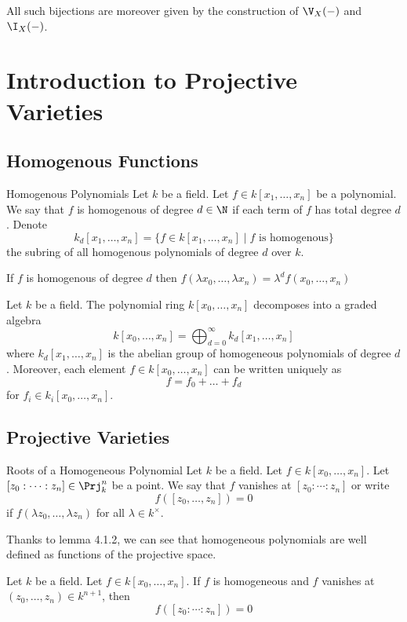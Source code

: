 \documentclass[a4paper]{article}
\begin{document}
All such bijections are moreover given by the construction of $\V_X(-)$ and $\I_X(-)$. 

\pagebreak
\section{Introduction to Projective Varieties}
\subsection{Homogenous Functions}
\begin{defn}{Homogenous Polynomials}{} Let $k$ be a field. Let $f\in k[x_1,\dots,x_n]$ be a polynomial. We say that $f$ is homogenous of degree $d\in\N$ if each term of $f$ has total degree $d$. Denote $$k_d[x_1,\dots,x_n]=\{f\in k[x_1,\dots,x_n]\;|\;f\text{ is homogenous}\}$$ the subring of all homogenous polynomials of degree $d$ over $k$. 
\end{defn}

\begin{lmm}{}{} If $f$ is homogenous of degree $d$ then $f(\lambda x_0,\dots,\lambda x_n)=\lambda^df(x_0,\dots,x_n)$
\end{lmm}

\begin{prp}{}{} Let $k$ be a field. The polynomial ring $k[x_0,\dots,x_n]$ decomposes into a graded algebra $$k[x_0,\dots,x_n]=\bigoplus_{d=0}^\infty k_d[x_1,\dots,x_n]$$ where $k_d[x_1,\dots,x_n]$ is the abelian group of homogeneous polynomials of degree $d$. Moreover, each element $f\in k[x_0,\dots,x_n]$ can be written uniquely as $$f=f_0+\dots+f_d$$ for $f_i\in k_i[x_0,\dots,x_n]$. 
\end{prp}

\subsection{Projective Varieties}
\begin{defn}{Roots of a Homogeneous Polynomial}{} Let $k$ be a field. Let $f\in k[x_0,\dots,x_n]$. Let $[z_0:\cdots:z_n]\in\Prj_k^n$ be a point. We say that $f$ vanishes at $[z_0:\cdots:z_n]$ or write $$f([z_0,\dots,z_n])=0$$ if $f(\lambda z_0,\dots,\lambda z_n)$ for all $\lambda\in k^\times$. 
\end{defn}

Thanks to lemma 4.1.2, we can see that homogeneous polynomials are well defined as functions of the projective space. 

\begin{lmm}{}{} Let $k$ be a field. Let $f\in k[x_0,\dots,x_n]$. If $f$ is homogeneous and $f$ vanishes at $(z_0,\dots,z_n)\in k^{n+1}$, then $$f([z_0:\cdots:z_n])=0$$
\end{lmm}
\end{document}
